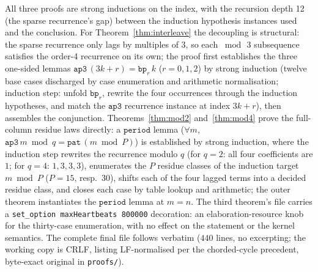 \documentclass[11pt]{article}
\begin{document}
All three proofs are strong inductions on the index, with the recursion
depth 12 (the sparse recurrence's gap) between the induction hypothesis
instances used and the conclusion. For Theorem~\ref{thm:interleave} the
decoupling is structural: the sparse recurrence only lags by multiples of
$3$, so each $\bmod\,3$ subsequence satisfies the order-4 recurrence on its
own; the proof first establishes the three one-sided lemmas
$\mathtt{ap3}\,(3k+r)=\mathtt{bp}_r\,k$ ($r=0,1,2$) by strong induction
(twelve base cases discharged by case enumeration and arithmetic normalisation;
induction step: unfold $\mathtt{bp}_r$, rewrite the four occurrences through
the induction hypotheses, and match the $\mathtt{ap3}$ recurrence instance at
index $3k+r$), then assembles the conjunction. Theorems~\ref{thm:mod2}
and~\ref{thm:mod4} prove the full-column residue laws directly: a
$\mathtt{period}$ lemma ($\forall m$, $\mathtt{ap3}\,m \bmod q =
\mathtt{pat}\,(m \bmod P)$) is established by strong induction, where the
induction step rewrites the recurrence modulo $q$ (for $q=2$: all four
coefficients are $1$; for $q=4$: $1,3,3,3$), enumerates the $P$ residue
classes of the induction target $m \bmod P$ ($P=15$, resp.\ $30$), shifts
each of the four lagged terms into a decided residue class, and closes each
case by table lookup and arithmetic; the outer theorem instantiates the
$\mathtt{period}$ lemma at $m=n$. The third theorem's file carries a
\texttt{set\_option maxHeartbeats 800000} decoration: an elaboration-resource
knob for the thirty-case enumeration, with no effect on the statement or the
kernel semantics. The complete final file follows verbatim ($440$ lines, no
excerpting; the working copy is CRLF, listing LF-normalised per the
chorded-cycle precedent, byte-exact original in \texttt{proofs/}).
\end{document}
